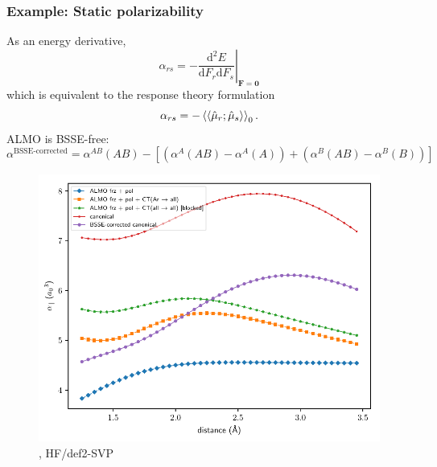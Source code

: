 \documentclass[xcolor=usenames,dvipsnames,svgnames]{beamer}
\newcommand{\arlidimer}{\ce{Ar\bond{....}Li+}}
\begin{document}
\begin{frame}
  \frametitle{Example: Static polarizability}
  As an energy derivative,
  \begin{equation*}
    \alpha_{rs} = - \left. \frac{\text{d}^{2}E}{\text{d}F_{r}\text{d}F_{s}} \right|_{\mathbf{F}=\mathbf{0}}
  \end{equation*}
  which is equivalent to the response theory formulation
  \begin{equation*}
    \alpha_{rs} = - \braket{\braket{\hat{\mu}_{r};\hat{\mu}_{s}}}_{0}.
  \end{equation*}
  ALMO is BSSE-free:
  {\scriptsize
  \begin{equation*}
    \alpha^{\text{BSSE-corrected}} = \alpha^{AB}(AB) - \left[ \left( \alpha^{A}(AB) - \alpha^{A}(A) \right) + \left( \alpha^{B}(AB) - \alpha^{B}(B) \right) \right]
    \label{eq:bsse-corrected-polarizability}
  \end{equation*}}
\end{frame}

\begin{frame}
  \begin{figure}
    \centering
    \includegraphics[width=\linewidth,keepaspectratio]{../paper_04/almo_vs_bsse_canonical_onaxis_projected_short_def2-SVP.pdf}
    \caption*{\arlidimer{}, HF/def2-SVP}
  \end{figure}
\end{frame}
\end{document}
